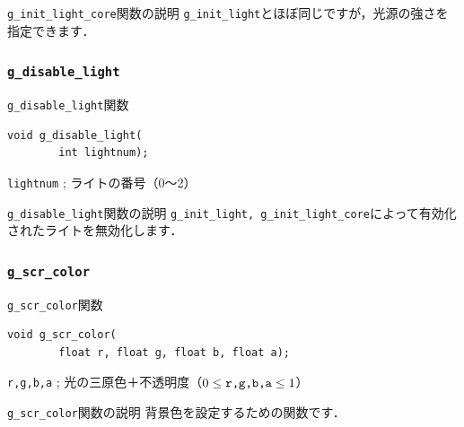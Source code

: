 \documentclass[platex,a4paper,12pt]{jsarticle}%
\begin{document}
\begin{itembox}[l]{\texttt{g\_init\_light\_core}関数の説明}
\texttt{g\_init\_light}とほぼ同じですが，光源の強さを指定できます．
\end{itembox}

\subsubsection{\texttt{g\_disable\_light}}

\begin{itembox}[l]{\texttt{g\_disable\_light}関数}
\begin{verbatim}
void g_disable_light(
        int lightnum);
\end{verbatim}
\verb|lightnum| ; ライトの番号（0〜2）
\end{itembox}

\begin{itembox}[l]{\texttt{g\_disable\_light}関数の説明}
\verb|g_init_light, g_init_light_core|によって有効化されたライトを無効化します．
\end{itembox}


\clearpage
\subsubsection{\texttt{g\_scr\_color}}

\begin{itembox}[l]{\texttt{g\_scr\_color}関数}
\begin{verbatim}
void g_scr_color(
        float r, float g, float b, float a);
\end{verbatim}
\verb|r,g,b,a| ; 光の三原色＋不透明度（$0\leq \verb|r,g,b,a| \leq 1$）\\
\end{itembox}

\begin{itembox}[l]{\texttt{g\_scr\_color}関数の説明}
	背景色を設定するための関数です．
\end{itembox}
\end{document}
